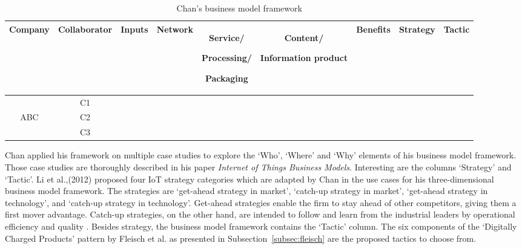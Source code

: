 		\begin{table}[h!]
			\scriptsize
			\centering			
			\caption{Chan's business model framework \cite{chan}}
			\label{tab:chan}
			\centering
			\vspace{0.2cm}
			\renewcommand{\arraystretch}{1.5}

			\begin{tabular}{| c | c | c | c | c | c | c | c | c |}

				\hline
				\rule{0pt}{8pt}
				Company & Collaborator & Inputs & Network & \parbox[m]{0.6in}{\centering\strut Service/ \par Processing/ \par Packaging \strut} & \parbox[m]{0.6in}{\centering\strut Content/ \par Information product \strut} & Benefits & Strategy & Tactic\\
				\hline
				        & C1           &        &         &                                                          &                                                   &          &          &       \\
				ABC     & C2           &        &         &                                                          &                                                   &          &          &       \\
				        & C3           &        &         &                                                          &                                                   &          &          &       \\
				\hline
			\end{tabular}
		\end{table}

		Chan applied his framework on multiple case studies to explore the `Who', `Where' and `Why' elements of his business model framework. Those case studies are thoroughly described in his paper \emph{Internet of Things Business Models}\cite{chan}. Interesting are the columns `Strategy' and `Tactic'. Li et al.,(2012) \cite{li} proposed four IoT strategy categories which are adapted by Chan in the use cases for his three-dimensional business model framework. The strategies are `get-ahead strategy in market', `catch-up strategy in market', `get-ahead strategy in technology', and `catch-up strategy in technology'. Get-ahead strategies enable the firm to stay ahead of other competitors, giving them a first mover advantage. Catch-up strategies, on the other hand, are intended to follow and learn from the industrial leaders by operational efficiency and quality \cite{chan}.
		Besides strategy, the business model framework contains the `Tactic' column. The six components of the `Digitally Charged Products' pattern by Fleisch et al. \cite{fleisch} as presented in Subsection~\ref{subsec:fleisch} are the proposed tactics to choose from.
%
